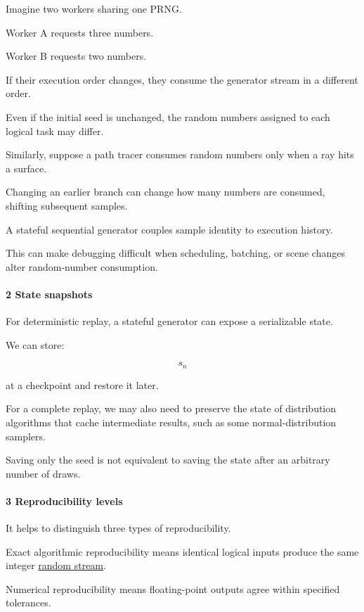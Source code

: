 Imagine two workers sharing one PRNG.

Worker A requests three numbers.

Worker B requests two numbers.

If their execution order changes, they consume the generator stream in a different order.

Even if the initial seed is unchanged, the random numbers assigned to each logical task may differ.

Similarly, suppose a path tracer consumes random numbers only when a ray hits a surface.

Changing an earlier branch can change how many numbers are consumed, shifting subsequent samples.

A stateful sequential generator couples sample identity to execution history.

This can make debugging difficult when scheduling, batching, or scene changes alter random-number consumption.

\paragraph{2 State snapshots}\label{state-snapshots}

For deterministic replay, a stateful generator can expose a serializable state.

We can store:

\[
 s_n
\]

at a checkpoint and restore it later.

For a complete replay, we may also need to preserve the state of distribution algorithms that cache intermediate results, such as some normal-distribution samplers.

Saving only the seed is not equivalent to saving the state after an arbitrary number of draws.

\paragraph{3 Reproducibility levels}\label{reproducibility-levels}

It helps to distinguish three types of reproducibility.

Exact algorithmic reproducibility means identical logical inputs produce the same integer \hyperref[02-foundations-ii-ch029]{random stream}.

Numerical reproducibility means floating-point outputs agree within specified tolerances.

